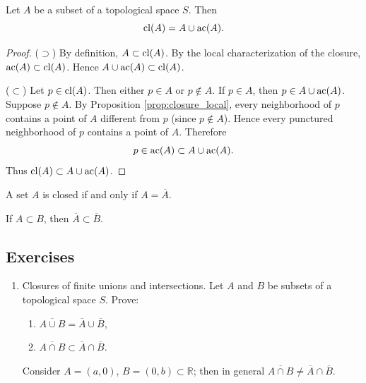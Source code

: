 \begin{proposition}
	Let $A$ be a subset of a topological space $S$. Then
	\begin{displaymath}
		\operatorname{cl}(A) = A \cup \operatorname{ac}(A).
	\end{displaymath}
\end{proposition}

\begin{proof}

	($\supset$) By definition, $A\subset \operatorname{cl}(A)$. By the local
	characterization of the closure, $\operatorname{ac}(A)\subset\operatorname{cl}(A)$. Hence $A\cup
		\operatorname{ac}(A) \subset \operatorname{cl}(A)$.

	($\subset$) Let $p\in\operatorname{cl}(A)$. Then either $p\in A$ or $p\not\in A$. If
	$p\in A$, then $p\in A\cup \operatorname{ac}(A)$. Suppose $p\not\in A$. By Proposition
	\ref{prop:closure_local}, every neighborhood of $p$ contains a point of
	$A$ different from $p$ (since $p\not\in A$). Hence every punctured
	neighborhood of $p$ contains a point of $A$. Therefore
	\begin{displaymath}
		p\in \operatorname{ac}(A) \subset A\cup \operatorname{ac}(A).
	\end{displaymath}
	Thus $\operatorname{cl}(A)\subset A\cup \operatorname{ac}(A)$.

\end{proof}

\begin{proposition}
	A set $A$ is closed if and only if $A=\overline{A}$.
\end{proposition}


\begin{proposition}
	If $A\subset B$, then $\overline{A}\subset\overline{B}$.
\end{proposition}


\subsection{Exercises}
\begin{enumerate}
	\item Closures of finite unions and intersections. Let $A$ and $B$ be
	      subsets of a topological space $S$. Prove:
	      \begin{enumerate}
		      \item [(a)] $\overline{A\cup B} = \overline{A} \cup \overline{B}$,
		      \item [(b)] $\overline{A\cap B} \subset \overline{A}\cap
			            \overline{B}$.
	      \end{enumerate}
	      Consider $A=(a,0)$, $B=(0,b)\subset\mathbb{R}$; then in general
	      $\overline{A\cap B} \neq \overline{A} \cap \overline{B}$.

\end{enumerate}




